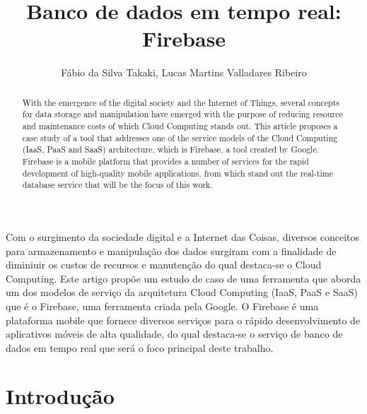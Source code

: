 \documentclass[12pt]{article}
\title{Banco de dados em tempo real: Firebase}
\author{Fábio da Silva Takaki\inst{1}, Lucas Martins Valladares Ribeiro\inst{1} }
\begin{document}
 

\maketitle

\begin{abstract}
   With the emergence of the digital society and the Internet of Things, several concepts for data storage and manipulation have emerged with the purpose of reducing resource and maintenance costs of which Cloud Computing stands out. This article proposes a case study of a tool that addresses one of the service models of the Cloud Computing (IaaS, PaaS and SaaS) architecture, which is Firebase, a tool created by Google. Firebase is a mobile platform that provides a number of services for the rapid development of high-quality mobile applications, from which stand out the real-time database service that will be the focus of this work.
\end{abstract}
     
\begin{resumo} 
   Com o surgimento da sociedade digital e a Internet das Coisas, diversos conceitos para armazenamento e manipulação dos dados surgiram com a finalidade de diminiuir os custos de recursos e manutenção do qual destaca-se o Cloud Computing. Este artigo propõe um estudo de caso de uma ferramenta que aborda um dos modelos de serviço da arquitetura Cloud Computing (IaaS, PaaS e SaaS) que é o Firebase, uma ferramenta criada pela Google. O Firebase é uma plataforma mobile que fornece diversos serviços para o rápido desenvolvimento de aplicativos móveis de alta qualidade, do qual destaca-se o serviço de banco de dados em tempo real que será o foco principal deste trabalho.
\end{resumo}


\section{Introdução}
\end{document}
